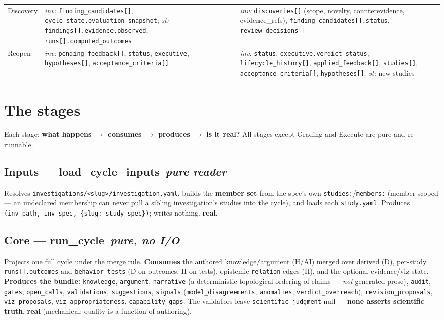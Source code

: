 \documentclass[11pt]{article}
\newcommand{\code}[1]{\texttt{\small #1}}
\newcommand{\real}{\textcolor{good}{\textbf{real}}}
\newcommand{\stage}[2]{\subsection*{\textcolor{accent}{#1}\, \normalfont\textit{\small #2}}}
\begin{document}
\begin{center}
\begin{tabularx}{\textwidth}{@{}>{\raggedright\arraybackslash}p{} Y Y@{}}
\addlinespace[2pt]
Discovery & \textit{inv:} \code{finding\_candidates[]}, \code{cycle\_state.evaluation\_snapshot}; \textit{st:} \code{findings[].evidence.observed}, \code{runs[].computed\_outcomes} & \textit{inv:} \code{discoveries[]} (scope, novelty, counterevidence, evidence\_refs), \code{finding\_candidates[].status}, \code{review\_decisions[]}\\
\addlinespace[2pt]
Reopen & \textit{inv:} \code{pending\_feedback[]}, \code{status}, \code{executive}, \code{hypotheses[]}, \code{acceptance\_criteria[]} & \textit{inv:} \code{status}, \code{executive.verdict\_status}, \code{lifecycle\_history[]}, \code{applied\_feedback[]}, \code{studies[]}, \code{acceptance\_criteria[]}, \code{hypotheses[]}; \textit{st:} new studies\\
\bottomrule
\end{tabularx}
\end{center}

\section{The stages}

Each stage: \textbf{what happens $\rightarrow$ consumes $\rightarrow$ produces $\rightarrow$
is it real?} All stages except Grading and Execute are pure and re-runnable.

\stage{Inputs --- load\_cycle\_inputs}{pure reader}
Resolves \code{investigations/<slug>/investigation.yaml}, builds the \textbf{member set} from
the spec's own \code{studies:}/\code{members:} (member-scoped --- an undeclared membership can
never pull a sibling investigation's studies into the cycle), and loads each \code{study.yaml}.
Produces \code{(inv\_path, inv\_spec, \{slug: study\_spec\})}; writes nothing. \real.

\stage{Core --- run\_cycle}{pure, no I/O}
Projects one full cycle under the merge rule. \textbf{Consumes} the authored knowledge/argument
(H/AI) merged over derived (D), per-study \code{runs[].outcomes} and \code{behavior\_tests} (D on
outcomes, H on tests), epistemic \code{relation} edges (H), and the optional evidence/viz state.
\textbf{Produces the bundle:} \code{knowledge}, \code{argument}, \code{narrative} (a
deterministic topological ordering of claims --- \emph{not} generated prose), \code{audit},
\code{gates}, \code{open\_calls}, \code{validations}, \code{suggestions}, \code{signals}
(\code{model\_disagreements}, \code{anomalies}, \code{verdict\_overreach}),
\code{revision\_proposals}, \code{viz\_proposals}, \code{viz\_appropriateness},
\code{capability\_gaps}. The validators leave \code{scientific\_judgment} null ---
\textbf{none asserts scientific truth}. \real{} (mechanical; quality is a function of authoring).
\end{document}
